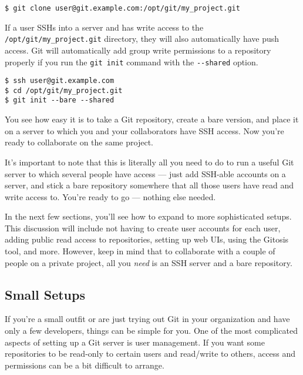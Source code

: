 \documentclass[a4paper]{book}
\begin{document}
\begin{shaded}\begin{verbatim}
$ git clone user@git.example.com:/opt/git/my_project.git
\end{verbatim}\end{shaded}

If a user SSHs into a server and has write access to the \texttt{/opt/git/my\_project.git} directory, they will also automatically have push access. Git will automatically add group write permissions to a repository properly if you run the \texttt{git init} command with the \texttt{-{}-shared} option.

\begin{shaded}\begin{verbatim}
$ ssh user@git.example.com
$ cd /opt/git/my_project.git
$ git init --bare --shared
\end{verbatim}\end{shaded}

You see how easy it is to take a Git repository, create a bare version, and place it on a server to which you and your collaborators have SSH access. Now you're ready to collaborate on the same project.

It's important to note that this is literally all you need to do to run a useful Git server to which several people have access --- just add SSH-able accounts on a server, and stick a bare repository somewhere that all those users have read and write access to. You're ready to go --- nothing else needed.

In the next few sections, you'll see how to expand to more sophisticated setups. This discussion will include not having to create user accounts for each user, adding public read access to repositories, setting up web UIs, using the Gitosis tool, and more. However, keep in mind that to collaborate with a couple of people on a private project, all you \emph{need} is an SSH server and a bare repository.

\subsection{Small Setups}

If you're a small outfit or are just trying out Git in your organization and have only a few developers, things can be simple for you. One of the most complicated aspects of setting up a Git server is user management. If you want some repositories to be read-only to certain users and read/write to others, access and permissions can be a bit difficult to arrange.
\end{document}
